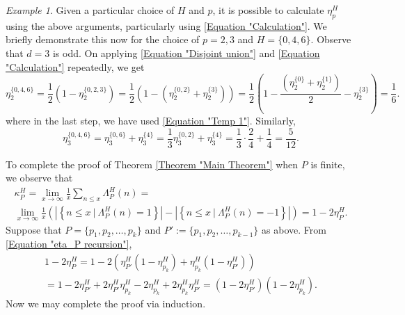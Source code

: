 \documentclass[12pt, a4paper]{amsart}
\theoremstyle{remark}
\newtheorem{example}{Example}
\theoremstyle{proof}
\numberwithin{equation}{section}
\numberwithin{assumption}{section}
\begin{document}
	\begin{example}\label{Example}
		Given a particular choice of $H$ and $p$, it is possible to calculate $\eta_p^H$ using the above arguments, particularly using \eqref{Equation "Calculation"}. We briefly demonstrate this now for the choice of $p=2,3$ and $H=\{0,4,6\}$. Observe that $d=3$ is odd. On applying \eqref{Equation "Disjoint union"} and \eqref{Equation "Calculation"} repeatedly, we get 
		\[
		\eta_2^{\{0,4,6\}} = \frac{1}{2}\left(1 - \eta_2^{\{0,2,3\}}\right)	= \frac{1}{2}\left(1 - \left(\eta_2^{\{0,2\}} + \eta_2^{\{3\}}\right)\right)	= \frac{1}{2}\left(1 - \frac{(\eta_2^{\{0\}} + \eta_2^{\{1\}})}{2} - \eta_2^{\{3\}}\right) = \frac{1}{6}.
		\]
		where in the last step, we have used \eqref{Equation "Temp 1"}. Similarly,
		\[
		\eta_3^{\{0,4,6\}} = \eta_3^{\{0,6\}} + \eta_3^{\{4\}} = \frac{1}{3}\eta_3^{\{0,2\}} + \eta_3^{\{4\}} = \frac{1}{3}\cdot \frac{2}{4} + \frac{1}{4} = \frac{5}{12}.
		\]
	\end{example}
	
	To complete the proof of Theorem \ref{Theorem "Main Theorem"} when $P$ is finite, we observe that
	\begin{multline*}
		\kappa_{P}^{H}=\lim_{x\to\infty} \frac{1}{x} \sum_{n\leqslant x} \Lambda_{P}^H(n)
		=\\ \lim_{x\to\infty} \frac{1}{x}\left( \left|\left\{n\leqslant x\ |\ \Lambda_{P}^H(n)=1\right\}\right| -  \left|\left\{n\leqslant x\ |\ \Lambda_{P}^H(n)=-1\right\}\right| \right)
		= 1-2\eta_P^H.
	\end{multline*}
	Suppose that $P = \{p_1,p_2,\ldots, p_k\}$ and $P':=\{p_1,p_2,\ldots, p_{k-1}\}$ as above. From \eqref{Equation "eta_P recursion"}, 
	\begin{multline*}
		1 - 2\eta_P^H = 1 - 2\left(\eta_{P'}^H(1-\eta_{p_k}^H) + \eta_{p_k}^H(1-\eta_{P'}^H)\right)\\
		= 1- 2\eta_{P'}^H + 2\eta_{P'}^H\eta_{p_k}^H - 2 \eta_{p_k}^H + 2\eta_{p_k}^H\eta_{P'}^H
		= (1-2\eta_{P'}^H)(1-2\eta_{p_k}^H).
	\end{multline*}
	Now we may complete the proof via induction.
	
\end{document}
